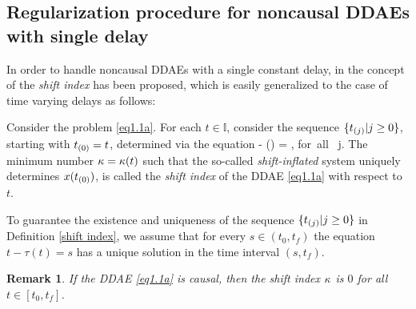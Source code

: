 \documentclass[final,reqno]{siamltex}
\newtheorem{remark}[theorem]{Remark}
\begin{document}
\subsection{Regularization procedure for noncausal DDAEs with single delay}\label{Sec2.2}
In order to handle noncausal DDAEs with a single constant delay, in \cite{HaM14} the
concept of the \emph{shift index} has been proposed, which is easily generalized to the case of time varying delays
as follows:
%
\begin{definition}\label{shift index}
Consider the problem \eqref{eq1.1a}. For each $t\in \mathbb{I}$, consider the sequence $\{t_{(j)}| j\geq 0\}$, starting with $t_{(0)}=t$,
determined via the equation
%
\be\label{eq14}
  - \tau() = , \quad \mbox{for all } j.
\ee
%
The minimum number $\kappa = \kappa(t)$ such that the so-called \emph{shift-inflated} system
%
\be\label{eq13}
\ee
%
uniquely determines $x(t_{(0)})$, is called the \emph{shift index} of the DDAE \eqref{eq1.1a} with respect to $t$.
\end{definition}

To guarantee the existence and uniqueness of the sequence $\{t_{(j)}| j\geq 0\}$ in Definition \ref{shift index}, we assume that for every $s \in (t_0,t_f)$ the equation
$ t -\tau(t) = s$
has a unique solution in the time interval $(s,t_f)$.

\begin{remark}{\rm
If the DDAE \eqref{eq1.1a} is causal, then the shift index $\kappa$ is $0$ for all $t \in [t_0,t_f]$.
}
\end{remark}
\end{document}
